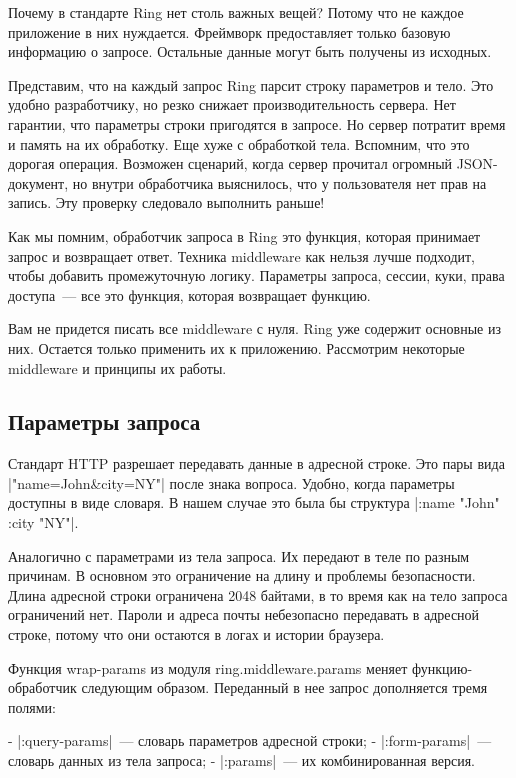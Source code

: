 Почему в стандарте Ring нет столь важных вещей? Потому что не каждое приложение
в них нуждается. Фреймворк предоставляет только базовую информацию о
запросе. Остальные данные могут быть получены из исходных.

Представим, что на каждый запрос Ring парсит строку параметров и тело. Это
удобно разработчику, но резко снижает производительность сервера. Нет гарантии,
что параметры строки пригодятся в запросе. Но сервер потратит время и память на
их обработку. Еще хуже с обработкой тела. Вспомним, что это дорогая
операция. Возможен сценарий, когда сервер прочитал огромный JSON-документ, но
внутри обработчика выяснилось, что у пользователя нет прав на запись. Эту
проверку следовало выполнить раньше!

Как мы помним, обработчик запроса в Ring это функция, которая принимает запрос и
возвращает ответ. Техника middleware как нельзя лучше подходит, чтобы добавить
промежуточную логику. Параметры запроса, сессии, куки, права доступа~--- все это
функция, которая возвращает функцию.

Вам не придется писать все middleware с нуля. Ring уже содержит основные из
них. Остается только применить их к приложению. Рассмотрим некоторые middleware
и принципы их работы.

\subsection{Параметры запроса}

Стандарт HTTP разрешает передавать данные в адресной строке. Это пары вида
\spverb|"name=John&city=NY"| после знака вопроса. Удобно, когда параметры доступны в виде
словаря. В нашем случае это была бы структура \spverb|{:name "John" :city "NY"}|.

Аналогично с параметрами из тела запроса. Их передают в теле по разным
причинам. В основном это ограничение на длину и проблемы безопасности. Длина
адресной строки ограничена 2048 байтами, в то время как на тело запроса
ограничений нет. Пароли и адреса почты небезопасно передавать в адресной строке,
потому что они остаются в логах и истории браузера.

Функция wrap-params из модуля ring.middleware.params меняет функцию-обработчик
следующим образом. Переданный в нее запрос дополняется тремя полями:

- \spverb|:query-params|~--- словарь параметров адресной строки;
- \spverb|:form-params|~--- словарь данных из тела запроса;
- \spverb|:params|~--- их комбинированная версия.

